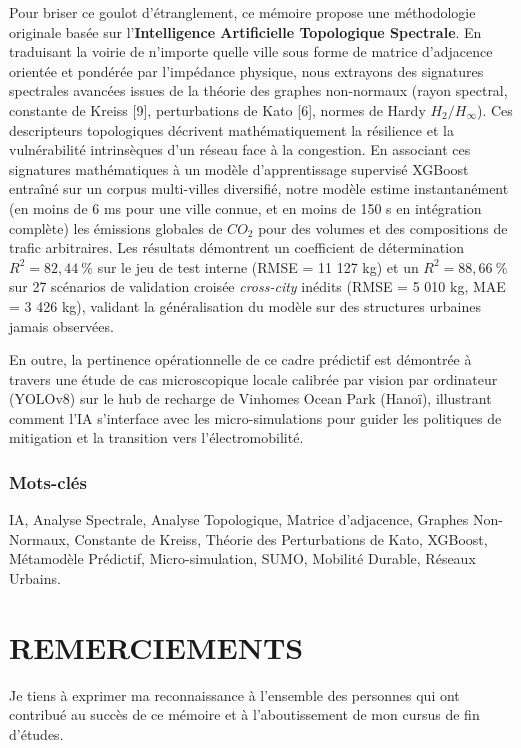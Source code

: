 \documentclass[10pt, a4paper]{article}
\begin{document}
Pour briser ce goulot d'étranglement, ce mémoire propose une
méthodologie originale basée sur l'\textbf{Intelligence Artificielle
Topologique Spectrale}. En traduisant la voirie de n'importe quelle
ville sous forme de matrice d'adjacence orientée et pondérée par
l'impédance physique, nous extrayons des signatures spectrales avancées
issues de la théorie des graphes non-normaux (rayon spectral, constante
de Kreiss {[}9{]}, perturbations de Kato {[}6{]}, normes de Hardy
\(H_2/H_\infty\)). Ces descripteurs topologiques décrivent
mathématiquement la résilience et la vulnérabilité intrinsèques d'un
réseau face à la congestion. En associant ces signatures mathématiques à
un modèle d'apprentissage supervisé XGBoost entraîné sur un corpus
multi-villes diversifié, notre modèle estime instantanément (en moins de
6 ms pour une ville connue, et en moins de 150 s en intégration
complète) les émissions globales de \(CO_2\) pour des volumes et des
compositions de trafic arbitraires. Les résultats démontrent un
coefficient de détermination \(R^2 = 82{,}44\ \%\) sur le jeu de test
interne (RMSE = 11 127 kg) et un \(R^2 = 88{,}66\ \%\) sur 27 scénarios
de validation croisée \emph{cross-city} inédits (RMSE = 5 010 kg, MAE =
3 426 kg), validant la généralisation du modèle sur des structures
urbaines jamais observées.

En outre, la pertinence opérationnelle de ce cadre prédictif est
démontrée à travers une étude de cas microscopique locale calibrée par
vision par ordinateur (YOLOv8) sur le hub de recharge de Vinhomes Ocean
Park (Hanoï), illustrant comment l'IA s'interface avec les
micro-simulations pour guider les politiques de mitigation et la
transition vers l'électromobilité.

\subsubsection{Mots-clés}\label{mots-cluxe9s}

IA, Analyse Spectrale, Analyse Topologique, Matrice d'adjacence, Graphes
Non-Normaux, Constante de Kreiss, Théorie des Perturbations de Kato,
XGBoost, Métamodèle Prédictif, Micro-simulation, SUMO, Mobilité Durable,
Réseaux Urbains.

\newpage

\section{REMERCIEMENTS}\label{remerciements}

Je tiens à exprimer ma reconnaissance à l'ensemble des personnes qui ont
contribué au succès de ce mémoire et à l'aboutissement de mon cursus de
fin d'études.
\end{document}
